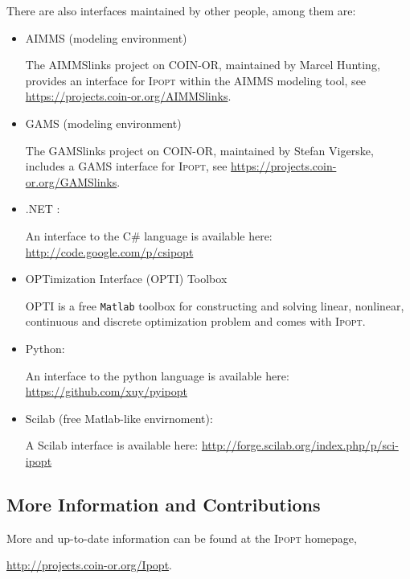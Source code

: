 \documentclass[10pt]{article}
\newcommand{\Ipopt}{\textsc{Ipopt}\xspace}
\begin{document}
There are also interfaces maintained by other people, among them are:
\begin{itemize}
\item AIMMS (modeling environment)

  The AIMMSlinks project on COIN-OR, maintained by Marcel Hunting,
  provides an interface for \Ipopt within the AIMMS modeling tool, see
  \url{https://projects.coin-or.org/AIMMSlinks}.
  
\item GAMS (modeling environment)

  The GAMSlinks project on COIN-OR, maintained by Stefan Vigerske,
  includes a GAMS interface for \Ipopt, see
  \url{https://projects.coin-or.org/GAMSlinks}.

\item .NET :
  
  An interface to the C\# language is available here: 
  \url{http://code.google.com/p/csipopt}
  
\item OPTimization Interface (OPTI) Toolbox

  OPTI is a free {\tt Matlab} toolbox for constructing and solving linear, 
  nonlinear, continuous and discrete optimization problem and comes with 
  \Ipopt.
  
\item Python:

  An interface to the python language is available here: 
  \url{https://github.com/xuy/pyipopt}
    
\item Scilab (free Matlab-like envirnoment):


  A Scilab interface is available here: 
  \url{http://forge.scilab.org/index.php/p/sci-ipopt}
\end{itemize}

\subsection{More Information and Contributions}
More and up-to-date information can be found at the \Ipopt homepage,

\begin{center}
\url{http://projects.coin-or.org/Ipopt}.
\end{center}
\end{document}
